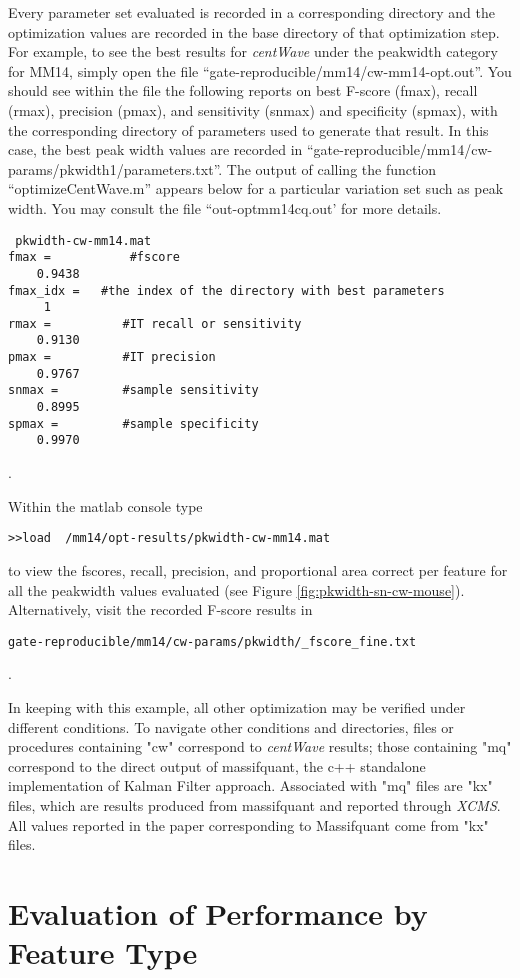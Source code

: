 \documentclass[11pt]{amsart}
\begin{document}
Every parameter set evaluated is recorded in a corresponding directory and the optimization values are recorded in the base directory of that optimization step. For example, to see the best results for  \emph{centWave} under the peakwidth category for MM14, simply open the file ``gate-reproducible/mm14/cw-mm14-opt.out''. You should see within the file the following reports on best F-score (fmax), recall (rmax), precision (pmax), and sensitivity (snmax) and specificity (spmax), with the corresponding directory of parameters used to generate that result. In this case, the best peak width values are recorded in ``gate-reproducible/mm14/cw-params/pkwidth1/parameters.txt''. The output of calling the function ``optimizeCentWave.m'' appears below for a particular variation set such as peak width. You may consult the file ``out-optmm14cq.out' for more details. 
 \begin{verbatim}
 pkwidth-cw-mm14.mat 
fmax =           #fscore
    0.9438
fmax_idx =   #the index of the directory with best parameters  
     1
rmax =          #IT recall or sensitivity
    0.9130 
pmax =          #IT precision
    0.9767
snmax =         #sample sensitivity
    0.8995
spmax =         #sample specificity
    0.9970
  \end{verbatim}.

Within the matlab console type  \begin{verbatim}>>load  /mm14/opt-results/pkwidth-cw-mm14.mat\end{verbatim} 
to view the fscores, recall, precision, and proportional area correct per feature for all the peakwidth values evaluated (see Figure \ref{fig:pkwidth-sn-cw-mouse}). Alternatively, visit the recorded F-score results in  
\begin{verbatim}gate-reproducible/mm14/cw-params/pkwidth/_fscore_fine.txt \end{verbatim}. 

In keeping with this example, all other optimization may be verified under different conditions. To navigate other conditions and directories, files or procedures containing "cw" correspond to \emph{centWave} results; those containing "mq" correspond to the direct output of massifquant, the c++ standalone implementation of Kalman Filter approach. Associated with "mq" files are "kx" files, which are results produced from massifquant and reported through \emph{XCMS}. All values reported in the paper corresponding to Massifquant come from "kx" files. 

\section{Evaluation of Performance by Feature Type}
\end{document}

